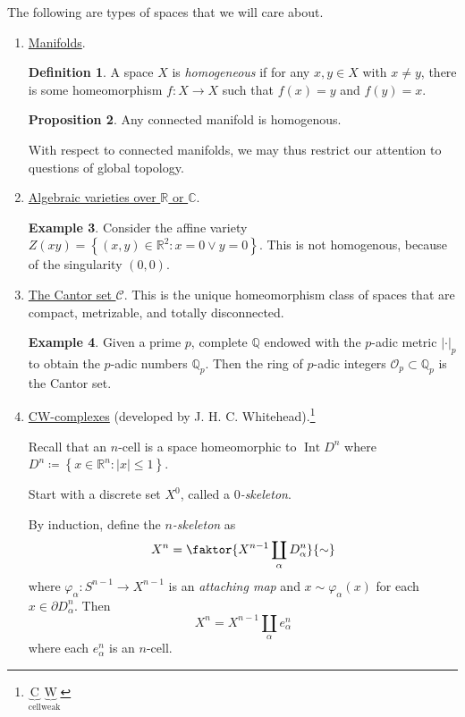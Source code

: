 \documentclass[10pt,letterpaper,cm]{nupset}
\theoremstyle{definition}
\newtheorem{definition}{Definition}[subsection]
\newtheorem{exmp}[definition]{Example}
\theoremstyle{theorem}
\newtheorem{prop}[definition]{Proposition}
\theoremstyle{remark}
\newcommand{\C}{\mathbb C}
\newcommand{\Q}{\mathbb Q}
\newcommand{\R}{\mathbb{R}}
\newcommand{\1}{\mathbb{1}}
\newcommand{\0}{\vec 0}
\DeclareMathOperator{\Int}{Int}
\begin{document}
The following are types of spaces that we will care about.
\begin{enumerate}
\item \underline{Manifolds}.
\begin{definition}
A space $X$ is \textit{homogeneous} if for any $x,y \in X$ with $x\ne y$, there is some homeomorphism $f: X \to X$ such that $f(x)= y$ and $f(y) =x$.
\end{definition}
\begin{prop}
Any connected manifold is homogenous. 
\end{prop}
With respect to connected manifolds, we may thus restrict our attention to questions of global topology.
\item \underline{Algebraic varieties over $\R$ or $\C$}.
\begin{exmp}
Consider the affine variety $Z(xy) =\left\{\left(x, y\right) \in \R^2 : x=0 \lor y=0\right\}$. This is not homogenous, because of the singularity $\left(0,0\right)$.  
\end{exmp}
\item \underline{The Cantor set $\mathcal{C}$}. This is the unique homeomorphism class of spaces that are compact, metrizable, and totally disconnected. 
\begin{exmp}
Given a prime $p$, complete $\Q$ endowed with the $p$-adic metric $\left\lvert{\cdot}\right\rvert_p$ to obtain the $p$-adic numbers $\Q_p$. Then the ring of $p$-adic integers $\mathcal{O}_p \subset \Q_p$ is the Cantor set.
\end{exmp}
\item \underline{CW-complexes} (developed by J. H. C. Whitehead).\footnote{$ \underbrace{\text{C}}_{\text{cell}}\underbrace{\text{W}}_{\text{weak}} $} 

Recall that an $n$-cell is a space homeomorphic to $\Int{D^n}$ where $D^n \coloneqq  \left\{x \in \R^n : \left\lvert{x}\right\rvert \leq 1\right\}$.

Start with a discrete set $X^0$, called a \textit{$0$-skeleton}. 

By induction, define the \textit{$n$-skeleton} as $$X^n = \faktor{X^{n-1} \coprod_{\alpha} D^n_{\alpha}}{\sim}$$ where $\varphi_{\alpha}: S^{n-1} \to X^{n-1}$ is an \textit{attaching map} and $x\sim \varphi_{\alpha}(x)$ for each $x\in \partial{D^n_{\alpha}}$. Then $$X^n = X^{n-1} \coprod_{\alpha} e^n_{\alpha}$$ where each $e^n_{\alpha}$ is an $n$-cell.


\end{enumerate}
\end{document}
